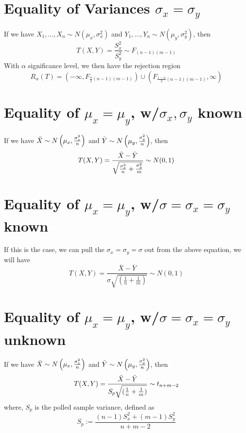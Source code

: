 \documentclass{article}
\begin{document}
\section{Equality of Variances $\sigma_x = \sigma_y$}
If we have $X_1,...,X_n\sim N(\mu_x, \sigma^2_x)$ and $Y_1,...,Y_n\sim 
N(\mu_y, \sigma^2_y)$, then
\begin{equation*}
    T(X,Y) = \frac{S_x^2}{S_y^2} \sim F_{(n-1)(m-1)}
\end{equation*}
With $\alpha$ significance level, we then have the rejection region
\begin{equation*}
     R_\alpha(T) = \left(-\infty,F_{\frac{\alpha}{2}(n-1)(m-1)}\right) 
\cup \left(F_{\frac{1-\alpha}{2}(n-1)(m-1)}, \infty\right) 
\end{equation*}

\section{Equality of $\mu_x = \mu_y$, w/$\sigma_x, \sigma_y$ known}
If we have $\Bar{X} \sim N\left( \mu_x, \frac{\sigma_x^2}{n} \right)$ 
and $\Bar{Y} \sim N\left( \mu_y, \frac{\sigma_y^2}{n} \right)$, then 
\begin{equation*}
    T(X,Y) = \frac{\Bar{X} - \Bar{Y}}{\sqrt{\frac{\sigma_x^2}{n} + 
\frac{\sigma_y^2}{m}}}\sim N(0, 1)
\end{equation*}

\section{Equality of $\mu_x = \mu_y$, w/$\sigma=\sigma_x=\sigma_y$ 
known}
If this is the case, we can pull the $\sigma_x = \sigma_y = \sigma$ 
out from the above equation, we will have
\begin{equation*}
    T(X,Y) = \frac{\bar{X} - \bar{Y}}{\sigma \sqrt{(\frac{1}{n} + 
\frac{1}{m})}} \sim N(0, 1)
\end{equation*}

\section{Equality of $\mu_x = \mu_y$, w/$\sigma = \sigma_x = \sigma_y$ 
unknown}
If we have $\Bar{X} \sim N\left( \mu_x, \frac{\sigma_x^2}{n} \right)$ 
and $\Bar{Y} \sim N\left( \mu_y, \frac{\sigma_y^2}{n} \right)$, then 
\begin{equation*}
    T(X,Y) = \frac{\Bar{X} - \Bar{Y}}{S_p \sqrt{(\frac{1}{n} + 
\frac{1}{m})}} \sim t_{n+m-2}
\end{equation*}
where, $S_p$ is the polled sample variance, defined as
\begin{equation*}
    S_p := \frac{(n-1)S_x^2 + (m-1)S_y^2}{n+m-2}
\end{equation*}
\end{document}
